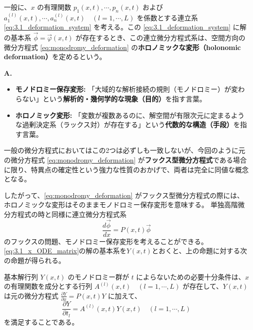\begin{definition}[ホロノミックな変形]
一般に、$x$ の有理関数 $p_{1}(x,t), \cdots, p_{n}(x,t)$ および $a_{1}^{(l)}(x,t), \cdots, a_{n}^{(l)}(x,t) \quad (l=1,\cdots,L)$ を係数とする連立系 \eqref{eq:3.1_deformation_system} を考える。この \eqref{eq:3.1_deformation_system} に解の基本系 $\vec{\phi}=\vec{\varphi}(x,t)$ が存在するとき、この連立微分方程式系は、空間方向の微分方程式 \eqref{eq:monodromy_deformation} の\textbf{ホロノミックな変形（holonomic deformation）}を定めるという。
\end{definition}

\begin{Q}
\textbf{A.} 
\begin{itemize}
    \item \textbf{モノドロミー保存変形:} 「大域的な解析接続の規則（モノドロミー）が変わらない」という\textbf{解析的・幾何学的な現象（目的）}を指す言葉。
    \item \textbf{ホロノミック変形:} 「変数が複数あるのに、解空間が有限次元に定まるような過剰決定系（ラックス対）が存在する」という\textbf{代数的な構造（手段）}を指す言葉。
\end{itemize}
一般の微分方程式においてはこの2つは必ずしも一致しないが、今回のように元の微分方程式 \eqref{eq:monodromy_deformation} が\textbf{フックス型微分方程式}である場合に限り、特異点の確定性という強力な性質のおかげで、両者は完全に同値な概念となる。
\end{Q}

したがって、\eqref{eq:monodromy_deformation} がフックス型微分方程式の際には、ホロノミックな変形はそのままモノドロミー保存変形を意味する。
単独高階微分方程式の時と同様に連立微分方程式系
\begin{equation}\label{eq:3.1_x_ODE_matrix}
\frac{d \vec{\phi}}{dx} = P(x,t)\vec{\phi}
\end{equation}
のフックスの問題、モノドロミー保存変形を考えることができる。\eqref{eq:3.1_x_ODE_matrix}の解の基本系を$Y(x,t)$とおくと、上の命題に対する次の命題が得られる。
\begin{proposition}\label{prop:3.1_monodromy_preservation_condition}
基本解行列 $Y(x,t)$ のモノドロミー群が $t$ によらないための必要十分条件は、$x$ の有理関数を成分とする行列 $A^{(l)}(x,t) \quad (l=1,\cdots,L)$ が存在して、$Y(x,t)$ は元の微分方程式 $\frac{\partial Y}{\partial x} = P(x,t)Y$ に加えて、
\begin{equation}
\frac{\partial Y}{\partial t_l} = A^{(l)}(x,t)Y(x,t) \quad (l=1,\cdots,L)
\label{eq:3.1_t_ODE_matrix}
\end{equation}
を満足することである。
\end{proposition}

